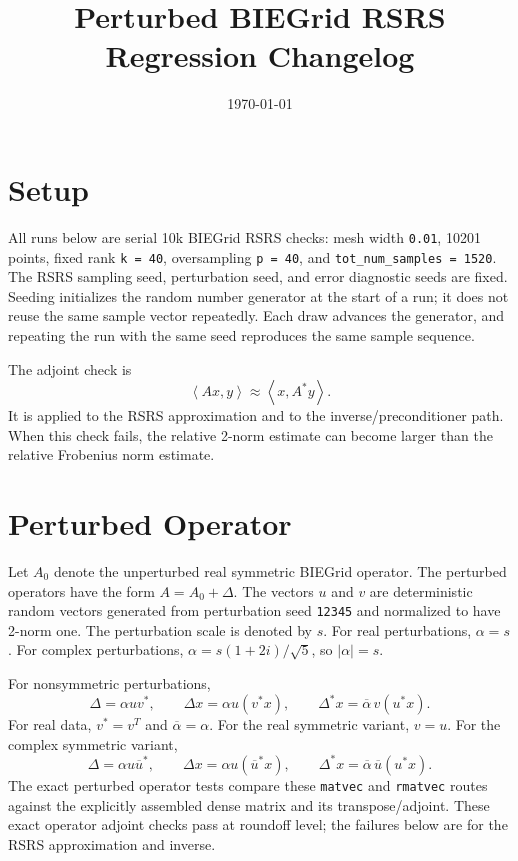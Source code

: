 \documentclass[11pt]{article}
\title{Perturbed BIEGrid RSRS Regression Changelog}
\author{}
\date{\today}
\newcommand{\ip}[2]{\left\langle #1, #2 \right\rangle}
\begin{document}
\maketitle

\section*{Setup}

All runs below are serial 10k BIEGrid RSRS checks: mesh width \texttt{0.01},
10201 points, fixed rank \texttt{k = 40}, oversampling \texttt{p = 40}, and
\texttt{tot\_num\_samples = 1520}. The RSRS sampling seed, perturbation seed,
and error diagnostic seeds are fixed. Seeding initializes the random number
generator at the start of a run; it does not reuse the same sample vector
repeatedly. Each draw advances the generator, and repeating the run with the
same seed reproduces the same sample sequence.

The adjoint check is
\[
    \ip{Ax}{y} \approx \ip{x}{A^*y}.
\]
It is applied to the RSRS approximation and to the inverse/preconditioner path.
When this check fails, the relative 2-norm estimate can become larger than the
relative Frobenius norm estimate.

\section*{Perturbed Operator}

Let $A_0$ denote the unperturbed real symmetric BIEGrid operator. The perturbed
operators have the form $A = A_0 + \Delta$. The vectors $u$ and $v$ are
deterministic random vectors generated from perturbation seed \texttt{12345} and
normalized to have 2-norm one. The perturbation scale is denoted by $s$. For
real perturbations, $\alpha = s$. For complex perturbations,
$\alpha = s(1+2i)/\sqrt{5}$, so $|\alpha| = s$.

For nonsymmetric perturbations,
\[
    \Delta = \alpha u v^*,\qquad
    \Delta x = \alpha u (v^* x),\qquad
    \Delta^* x = \overline{\alpha}\, v (u^* x).
\]
For real data, $v^* = v^T$ and $\overline{\alpha} = \alpha$. For the real
symmetric variant, $v = u$. For the complex symmetric variant,
\[
    \Delta = \alpha u \overline{u}^*,\qquad
    \Delta x = \alpha u (\overline{u}^* x),\qquad
    \Delta^* x = \overline{\alpha}\,\overline{u}(u^* x).
\]
The exact perturbed operator tests compare these \texttt{matvec} and
\texttt{rmatvec} routes against the explicitly assembled dense matrix and its
transpose/adjoint. These exact operator adjoint checks pass at roundoff level;
the failures below are for the RSRS approximation and inverse.
\end{document}
